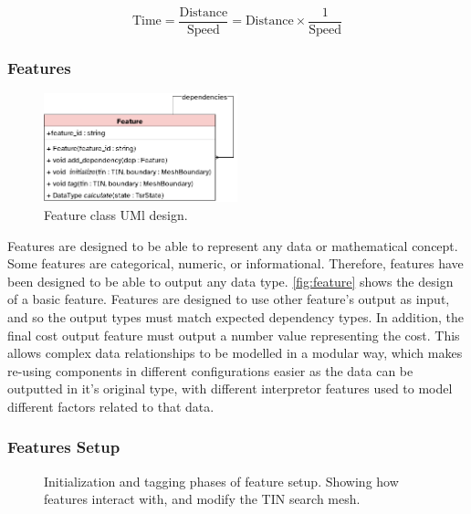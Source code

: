 \documentclass[12pt]{article}
\begin{document}
\[\text{Time} = \frac{\text{Distance}}{\text{Speed}} = \text{Distance} \times \frac{1}{\text{Speed}}\]

\subsubsection{Features}

\begin{figure}[!htbp]
  \includegraphics[width=0.5\textwidth]{assets/feature.png}
  \centering
  \caption{Feature class UMl design.}\label{fig:feature}
\end{figure}

Features are designed to be able to represent any data or mathematical concept. Some features are categorical, numeric, or informational. Therefore, features have been designed to be able to output any data type. \autoref{fig:feature} shows the design of a basic feature. Features are designed to use other feature's output as input, and so the output types must match expected dependency types. In addition, the final cost output feature must output a number value representing the cost. This allows complex data relationships to be modelled in a modular way, which makes re-using components in different configurations easier as the data can be outputted in it's original type, with different interpretor features used to model different factors related to that data.

\subsubsection{Features Setup}

\begin{figure}[!htbp]
  \centering
  \caption{Initialization and tagging phases of feature setup. Showing how features interact with, and modify the TIN search mesh.}
  \label{fig:design:features:setup}
\end{figure}
\end{document}
